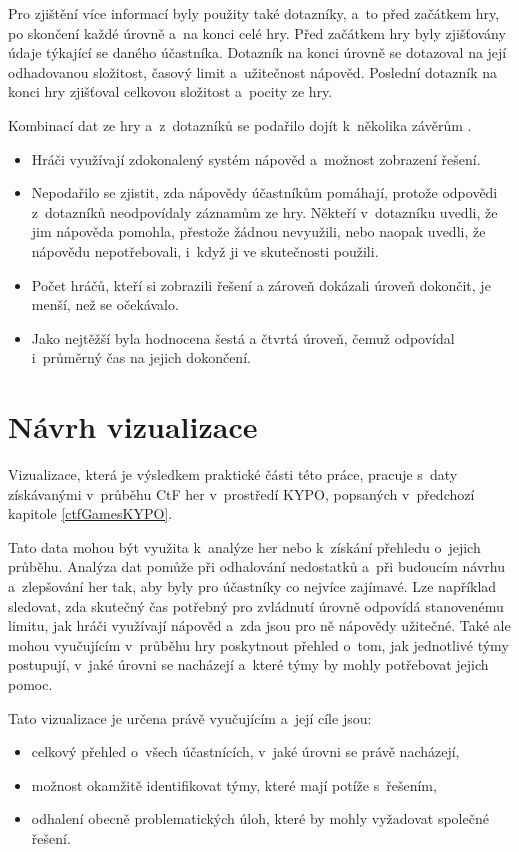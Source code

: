 \documentclass[
  digital, %
  oneside, %
  table,   %
  nolof,     %
  nolot,     %
  nocover
]{fithesis3}
\begin{document}
Pro zjištění více informací byly použity také dotazníky, a~to před začátkem hry, po skončení každé úrovně a~na konci celé hry. Před začátkem hry byly zjišťovány údaje týkající se daného účastníka. Dotazník na konci úrovně se dotazoval na její odhadovanou složitost, časový limit a~užitečnost nápověd. Poslední dotazník na konci hry zjišťoval celkovou složitost a~pocity ze hry.\par
Kombinací dat ze hry a~z~dotazníků se podařilo dojít k~několika závěrům \cite{ctfDesign}.
\begin{itemize}
  \item Hráči využívají zdokonalený systém nápověd a~možnost zobrazení řešení.
  \item Nepodařilo se zjistit, zda nápovědy účastníkům pomáhají, protože odpovědi z~dotazníků neodpovídaly záznamům ze hry. Někteří v~dotazníku uvedli, že jim nápověda pomohla, přestože žádnou nevyužili, nebo naopak uvedli, že nápovědu nepotřebovali, i~když ji ve skutečnosti použili.
  \item Počet hráčů, kteří si zobrazili řešení a zároveň dokázali úroveň dokončit, je menší, než se očekávalo.
  \item Jako nejtěžší byla hodnocena šestá a čtvrtá úroveň, čemuž odpovídal i~průměrný čas na jejich dokončení.
\end{itemize}

\chapter{Návrh vizualizace}
Vizualizace, která je výsledkem praktické části této práce, pracuje s~daty získávanými v~průběhu CtF her v~prostředí KYPO, popsaných v~předchozí kapitole \ref{ctfGamesKYPO}.\par
Tato data mohou být využita k~analýze her nebo k~získání přehledu o~jejich průběhu. Analýza dat pomůže při odhalování nedostatků a~při budoucím návrhu a~zlepšování her tak, aby byly pro účastníky co nejvíce zajímavé. Lze například sledovat, zda skutečný čas potřebný pro zvládnutí úrovně odpovídá stanovenému limitu, jak hráči využívají nápověd a~zda jsou pro ně nápovědy užitečné. Také ale mohou vyučujícím v~průběhu hry poskytnout přehled o~tom, jak jednotlivé týmy postupují, v~jaké úrovni se nacházejí a~které týmy by mohly potřebovat jejich pomoc.\par
Tato vizualizace je určena právě vyučujícím a~její cíle jsou:
\begin{itemize}
  \item celkový přehled o~všech účastnících, v~jaké úrovni se právě nacházejí,
  \item možnost okamžitě identifikovat týmy, které mají potíže s~řešením,
  \item odhalení obecně problematických úloh, které by mohly vyžadovat společné řešení.
\end{itemize}
\end{document}
